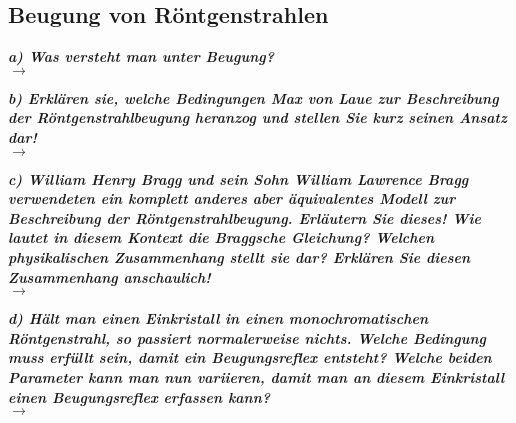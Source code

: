\subsection{\label{subsec:FZV5}Beugung von Röntgenstrahlen}
\textbf{\textit{a) Was versteht man unter Beugung?}}\\
$\rightarrow$

\textbf{\textit{b) Erklären sie, welche Bedingungen Max von Laue zur Beschreibung der
Röntgenstrahlbeugung heranzog und stellen Sie kurz seinen Ansatz dar!}}\\
$\rightarrow$

\textbf{\textit{c) William Henry Bragg und sein Sohn William Lawrence Bragg verwendeten
ein komplett anderes aber äquivalentes Modell zur Beschreibung der
Röntgenstrahlbeugung. Erläutern Sie dieses! Wie lautet in diesem Kontext
die Braggsche Gleichung? Welchen physikalischen Zusammenhang
stellt sie dar? Erklären Sie diesen Zusammenhang anschaulich!}}\\
$\rightarrow$

\textbf{\textit{d) Hält man einen Einkristall in einen monochromatischen Röntgenstrahl,
so passiert normalerweise nichts. Welche Bedingung muss erfüllt sein, damit
ein Beugungsreflex entsteht? Welche beiden Parameter kann man nun
variieren, damit man an diesem Einkristall einen Beugungsreflex erfassen
kann?}}\\
$\rightarrow$